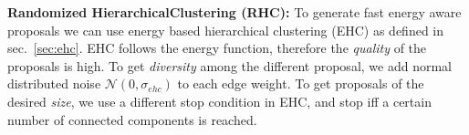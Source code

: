 \documentclass[10pt,twocolumn,letterpaper]{article}
\DeclareMathOperator*{\argmin}{arg\,min}
\DeclareMathOperator*{\argmax}{arg\,max}
\theoremstyle{definition}
\begin{document}
%



\noindent \textbf{Randomized HierarchicalClustering (RHC):}
%
To generate fast energy aware proposals we can use energy
based hierarchical clustering (EHC) as defined in sec.~\ref{sec:ehc}.
EHC follows the energy function, therefore the \emph{quality}
of the proposals is high.
To get \emph{diversity} among the different proposal,
we add normal distributed noise  $\mathcal{N}(0, \sigma_{ehc})$
to each edge weight.
To get proposals of the desired \emph{size}, we use a
different stop condition in EHC, and stop iff a certain number of connected
components is reached.
\end{document}

